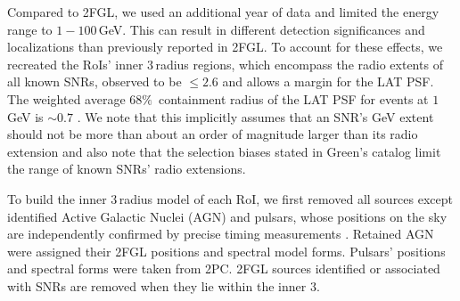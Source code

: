 Compared to 2FGL, we used an additional year of data and limited the energy range to $1-100$\,GeV. This can result in different detection significances and localizations than previously reported in 2FGL. To account for these effects, we recreated the RoIs' inner $3$\degr{}\,radius regions, which encompass the radio extents of all known SNRs, observed to be $\leq 2.6$\degr{} and allows a margin for the LAT PSF. 
The weighted average $68\%$~containment radius of the LAT PSF for %
events at $1$\,GeV is $\sim0.7$\degr{} \citep{LAT-instrument-paper}. %
We note that this implicitly assumes that an SNR's GeV extent should not be more than about an order of magnitude larger than its radio extension and also note that the selection biases stated in Green's catalog limit the range of known SNRs' radio extensions. 

To build the inner $3$\degr{}\,radius model of each RoI, we first removed all sources except identified Active Galactic Nuclei (AGN) and pulsars, whose positions on the sky are independently confirmed by precise timing measurements \citep{Abdo13-2PC}. Retained AGN were assigned their 2FGL positions and spectral model forms. Pulsars' positions and spectral forms were taken from 2PC. 2FGL sources identified or associated with SNRs are removed when they lie within the inner $3$\degr{}. %

